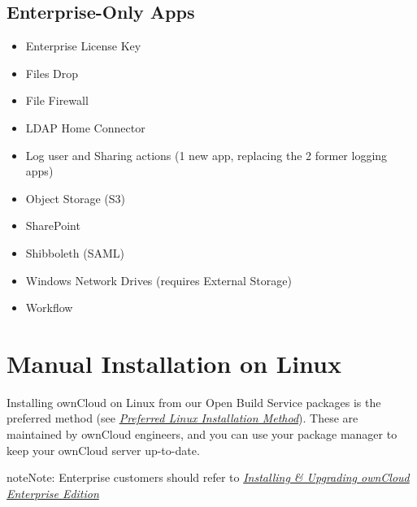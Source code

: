 \documentclass[letterpaper,10pt,english]{sphinxmanual}
\begin{document}
\subsection{Enterprise-Only Apps}
\label{installation/apps_supported:enterprise-only-apps}\begin{itemize}
\item {} 
Enterprise License Key

\item {} 
Files Drop

\item {} 
File Firewall

\item {} 
LDAP Home Connector

\item {} 
Log user and Sharing actions (1 new app, replacing the 2 former logging apps)

\item {} 
Object Storage (S3)

\item {} 
SharePoint

\item {} 
Shibboleth (SAML)

\item {} 
Windows Network Drives (requires External Storage)

\item {} 
Workflow

\end{itemize}


\section{Manual Installation on Linux}
\label{installation/source_installation::doc}\label{installation/source_installation:manual-installation-on-linux}
Installing ownCloud on Linux from our Open Build Service packages is the
preferred method (see {\hyperref[installation/linux_installation::doc]{\emph{Preferred Linux Installation Method}}}). These are maintained by
ownCloud engineers, and you can use your package manager to keep your ownCloud
server up-to-date.

\begin{notice}{note}{Note:}
Enterprise customers should refer to
{\hyperref[enterprise_installation/linux_installation::doc]{\emph{Installing \& Upgrading ownCloud Enterprise Edition}}}
\end{notice}
\end{document}
